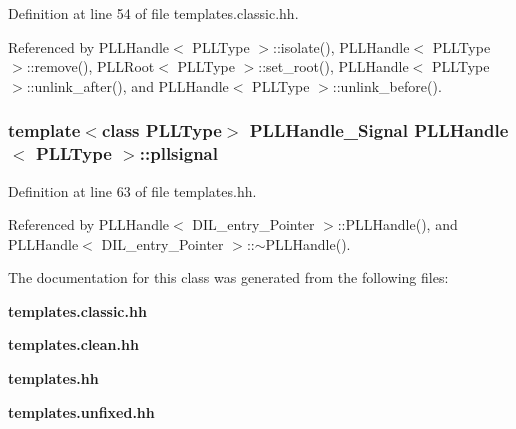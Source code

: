 Definition at line 54 of file templates.classic.hh.

Referenced by PLLHandle$<$ PLLType $>$::isolate(), PLLHandle$<$ PLLType $>$::remove(), PLLRoot$<$ PLLType $>$::set\_\-root(), PLLHandle$<$ PLLType $>$::unlink\_\-after(), and PLLHandle$<$ PLLType $>$::unlink\_\-before().
\subsubsection{\setlength{\rightskip}{0pt plus 5cm}template$<$class PLLType$>$ PLLHandle\_\-Signal PLLHandle$<$ {\bf PLLType} $>$::pllsignal\hspace{0.3cm}{\tt  [protected]}}\label{classPLLHandle_n9}




Definition at line 63 of file templates.hh.

Referenced by PLLHandle$<$ DIL\_\-entry\_\-Pointer $>$::PLLHandle(), and PLLHandle$<$ DIL\_\-entry\_\-Pointer $>$::$\sim$PLLHandle().

The documentation for this class was generated from the following files:\begin{CompactItemize}
\item 
{\bf templates.classic.hh}\item 
{\bf templates.clean.hh}\item 
{\bf templates.hh}\item 
{\bf templates.unfixed.hh}\end{CompactItemize}
